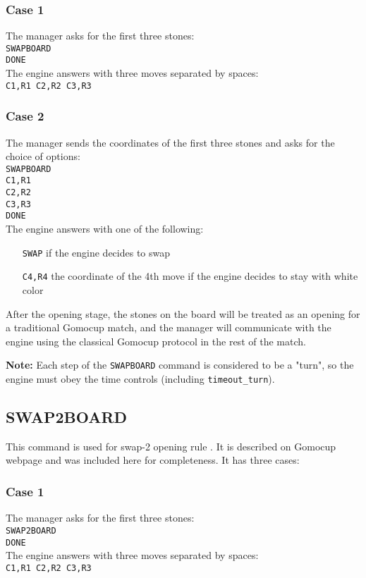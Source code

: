 \documentclass[12pt,a4paper]{article}
\begin{document}
\subsubsection{Case 1}
The manager asks for the first three stones:\\
\texttt{SWAPBOARD}\\
\texttt{DONE}\\
The engine answers with three moves separated by spaces:\\
\texttt{C1,R1 C2,R2 C3,R3}

\subsubsection{Case 2}
The manager sends the coordinates of the first three stones and asks for the choice of options:\\
\texttt{SWAPBOARD}\\
\texttt{C1,R1}\\
\texttt{C2,R2}\\
\texttt{C3,R3}\\
\texttt{DONE}\\
The engine answers with one of the following:
\begin{enumerate}[leftmargin=7.5em]
\item[\texttt{SWAP}]{if the engine decides to swap}
\item[\texttt{C4,R4}]{the coordinate of the 4th move if the engine decides to stay with white color}
\end{enumerate}

After the opening stage, the stones on the board will be treated as an opening for a traditional Gomocup match, and the manager will communicate with the engine using the classical Gomocup protocol in the rest of the match.

\textbf{Note:} Each step of the \texttt{SWAPBOARD} command is considered to be a "turn", so the engine must obey the time controls (including \texttt{timeout{\_}turn}).


\subsection{SWAP2BOARD}
\label{cmd_swap2board}
This command is used for swap-2 opening rule \cite{renju_opening_rules}. It is described on Gomocup webpage and was included here for completeness. It has three cases:

\subsubsection{Case 1}
The manager asks for the first three stones:\\
\texttt{SWAP2BOARD}\\
\texttt{DONE}\\
The engine answers with three moves separated by spaces:\\
\texttt{C1,R1 C2,R2 C3,R3}
\end{document}
